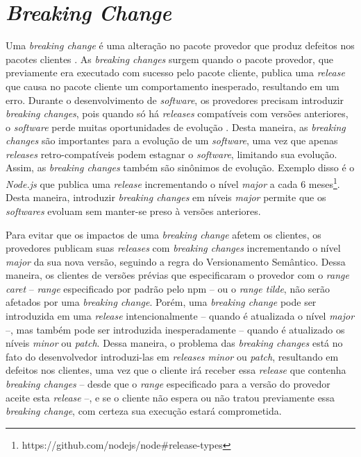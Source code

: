 \section{\textit{Breaking Change}}
\label{ref-teo:breaking_change}
Uma \textit{breaking change} é uma alteração no pacote provedor que produz defeitos nos pacotes clientes \cite{teorical_reference:semver}. As \textit{breaking changes} surgem quando o pacote provedor, que previamente era executado com sucesso pelo pacote cliente, publica uma \textit{release} que causa no pacote cliente um comportamento inesperado, resultando em um erro. Durante o desenvolvimento de \textit{software}, os provedores precisam introduzir \textit{breaking changes}, pois quando só há \textit{releases} compatíveis com versões anteriores, o \textit{software} perde muitas oportunidades de evolução \cite{teorical_reference:bc_2}. Desta maneira, as \textit{breaking changes} são importantes para a evolução de um \textit{software}, uma vez que apenas \textit{releases} retro-compatíveis podem estagnar o \textit{software}, limitando sua evolução. Assim, as \textit{breaking changes} também são sinônimos de evolução. Exemplo disso é o \textit{Node.js} que publica uma \textit{release} incrementando o nível \textit{major} a cada 6 meses\footnote{https://github.com/nodejs/node\#release-types}. Desta maneira, introduzir \textit{breaking changes} em níveis \textit{major} permite que os \textit{softwares} evoluam sem manter-se preso à versões anteriores.

Para evitar que os impactos de uma \textit{breaking change} afetem os clientes, os provedores publicam suas \textit{releases} com \textit{breaking changes} incrementando o nível \textit{major} da sua nova versão, seguindo a regra do Versionamento Semântico. Dessa maneira, os clientes de versões prévias que especificaram o provedor com o \textit{range caret} -- \textit{range} especificado por padrão pelo \gls{npm} -- ou o \textit{range tilde}, não serão afetados por uma \textit{breaking change}. Porém, uma \textit{breaking change} pode ser introduzida em uma \textit{release} intencionalmente -- quando é atualizada o nível \textit{major} --, mas também pode ser introduzida inesperadamente -- quando é atualizado os níveis \textit{minor} ou \textit{patch}. Dessa maneira, o problema das \textit{breaking changes} está no fato do desenvolvedor introduzi-las em \textit{releases minor} ou \textit{patch}, resultando em defeitos nos clientes, uma vez que o cliente irá receber essa \textit{release} que contenha \textit{breaking changes} -- desde que o \textit{range} especificado para a versão do provedor aceite esta \textit{release} --, e se o cliente não espera ou não tratou previamente essa \textit{breaking change}, com certeza sua execução estará comprometida.

